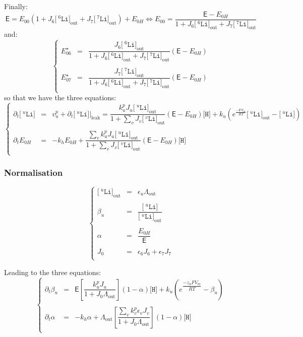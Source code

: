 \documentclass[aps,onecolumn,11pt]{revtex4}
\newcommand{\mychem}[1]{\mathtt{#1}}
\newcommand{\myconc}[1]{\big[#1\big]}
\newcommand{\Faraday}{\mathrm{F}}
\newcommand{\spLi}[1]{{\!~^{#1}\mychem{Li}}}
\newcommand{\Li}[1]{\myconc{\spLi{#1}}}
\newcommand{\spproton}{\mychem{H}}
\newcommand{\proton}{\myconc{\spproton}}
\newcommand{\myleak}[1]{\left.{#1}\right\vert_{\mathrm{leak}}}
\newcommand{\myout}[1]{{#1}_{\mathrm{out}}}
\newcommand{\LiOut}[1]{\myout{\Li{#1}}}
\newcommand{\LiAll}{\Lambda}
\newcommand{\LiAllOut}{\myout{\LiAll}}
\begin{document}
Finally:
\begin{equation}
\mathsf{E} = E_{00}\left(1+J_6\LiOut{6}+J_7\LiOut{7}\right) + E_{0H} \Leftrightarrow E_{00} = \dfrac{\mathsf{E}-E_{0H}}{1+J_6\LiOut{6}+J_7\LiOut{7}}
\end{equation}
and:
\begin{equation}
\left\lbrace
\begin{array}{rcl}
	E_{06}^\star & = & \dfrac{J_6\LiOut{6}}{1+J_6\LiOut{6}+J_7\LiOut{7}} \left(\mathsf{E}-E_{0H}\right)\\
	\\
	E_{07}^\star & = & \dfrac{J_7\LiOut{7}}{1+J_6\LiOut{6}+J_7\LiOut{7}} \left(\mathsf{E}-E_{0H}\right)\\
\end{array}
\right.
\end{equation}
so that we have the three equations:
\begin{equation}
\left\lbrace
\begin{array}{rcl}
	\partial_t \Li{u}  & = & v^p_u +\partial_t \myleak{\Li{u}}  = \dfrac{k^p_u J_u \LiOut{u}}{1+\sum_v J_v \LiOut{v}} \left(\mathsf{E}-E_{0H}\right) \proton + k_u \left( e^{\frac{-\Faraday V_m }{RT}} \LiOut{u} - \Li{u}\right) \\
	\\
	\partial_t E_{0H} & = & -k_h E_{0H} + \dfrac{\sum_v k^p_u J_u \LiOut{u}}{1+\sum_v J_v \LiOut{v}} \left(\mathsf{E}-E_{0H}\right) \proton \\
\end{array}
\right.
\end{equation}
\subsubsection{Normalisation}
\begin{equation}
\left\lbrace
\begin{array}{rcl}
	\LiOut{u} & = & \epsilon_u \LiAllOut\\
	\\
	\beta_u & = & \dfrac{\Li{u}}{\LiOut{u}}\\
	\\
	\alpha  & = & \dfrac{E_{0H}}{\mathsf{E}}\\
	\\
	J_0 & = & \epsilon_6 J_6  + \epsilon_7 J_7 \\
\end{array}
\right.
\end{equation}

Leading to the three equations:
\begin{equation}
\left\lbrace
\begin{array}{rcl}
	\partial_t \beta_u & = & \mathsf{E} \left[\dfrac{k^p_u J_u}{1+J_0 \LiAllOut}\right] \left(1-\alpha\right) \proton
	 + k_u \left( e^{\dfrac{-z_u F V_m }{RT}}- \beta_u\right)\\
	\\
	\partial_t \alpha  & = &  -k_h\alpha + \LiAllOut \left[\dfrac{ \sum_v k^p_v \epsilon_v J_v}{1+J_0\LiAllOut}\right] \left(1-\alpha\right) \proton\\
\end{array}
\right.
\end{equation}
\end{document}
